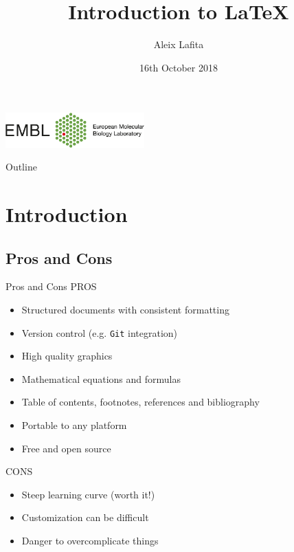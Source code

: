 \documentclass[inputenc]{beamer}
\title[Introduction to LaTeX]{\huge Introduction to \LaTeX{}}
\author{Aleix Lafita}
\institute{Bateman group (EMBL-EBI)}
\date{16th October 2018}
\begin{document}
\begin{frame}
  \titlepage
  \centering
  \includegraphics[width=0.4\textwidth]{embl_logo}
\end{frame}

\begin{frame}{Outline}
    \tableofcontents
\end{frame}

\section{Introduction}

\subsection{Pros and Cons}

\begin{frame}{Pros and Cons}
    PROS
    \begin{itemize}
        \item Structured documents with consistent formatting
        \item Version control (e.g. \texttt{Git} integration)
        \item High quality graphics
        \item Mathematical equations and formulas
        \item Table of contents, footnotes, references and bibliography
        \item Portable to any platform
        \item Free and open source
    \end{itemize}
    \vspace{0.5cm}
    CONS
    \begin{itemize}
        \item Steep learning curve (worth it!)
        \item Customization can be difficult
        \item Danger to overcomplicate things
    \end{itemize}
\end{frame}
\end{document}
